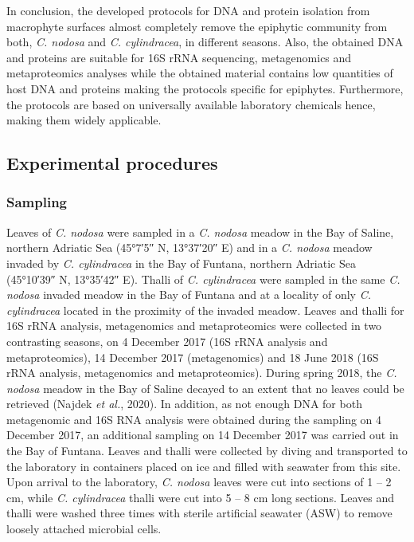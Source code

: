 \documentclass[12pt,]{article}
\begin{document}
In conclusion, the developed protocols for DNA and protein isolation
from macrophyte surfaces almost completely remove the epiphytic
community from both, \emph{C. nodosa} and \emph{C. cylindracea}, in
different seasons. Also, the obtained DNA and proteins are suitable for
16S rRNA sequencing, metagenomics and metaproteomics analyses while the
obtained material contains low quantities of host DNA and proteins
making the protocols specific for epiphytes. Furthermore, the protocols
are based on universally available laboratory chemicals hence, making
them widely applicable.

\newpage

\hypertarget{experimental-procedures}{%
\subsection{Experimental procedures}\label{experimental-procedures}}

\hypertarget{sampling}{%
\subsubsection{Sampling}\label{sampling}}

Leaves of \emph{C. nodosa} were sampled in a \emph{C. nodosa} meadow in
the Bay of Saline, northern Adriatic Sea (\ang{45;7;5} N, \ang{13;37;20}
E) and in a \emph{C. nodosa} meadow invaded by \emph{C. cylindracea} in
the Bay of Funtana, northern Adriatic Sea (\ang{45;10;39} N,
\ang{13;35;42} E). Thalli of \emph{C. cylindracea} were sampled in the
same \emph{C. nodosa} invaded meadow in the Bay of Funtana and at a
locality of only \emph{C. cylindracea} located in the proximity of the
invaded meadow. Leaves and thalli for 16S rRNA analysis, metagenomics
and metaproteomics were collected in two contrasting seasons, on 4
December 2017 (16S rRNA analysis and metaproteomics), 14 December 2017
(metagenomics) and 18 June 2018 (16S rRNA analysis, metagenomics and
metaproteomics). During spring 2018, the \emph{C. nodosa} meadow in the
Bay of Saline decayed to an extent that no leaves could be retrieved
(Najdek \emph{et al.}, 2020). In addition, as not enough DNA for both
metagenomic and 16S RNA analysis were obtained during the sampling on 4
December 2017, an additional sampling on 14 December 2017 was carried
out in the Bay of Funtana. Leaves and thalli were collected by diving
and transported to the laboratory in containers placed on ice and filled
with seawater from this site. Upon arrival to the laboratory, \emph{C.
nodosa} leaves were cut into sections of 1 -- 2 \si{\cm}, while \emph{C.
cylindracea} thalli were cut into 5 -- 8 \si{\cm} long sections. Leaves
and thalli were washed three times with sterile artificial seawater
(ASW) to remove loosely attached microbial cells.
\end{document}
